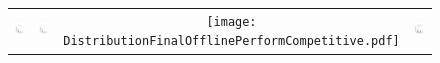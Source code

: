 \documentclass[10pt,journal,compsoc]{IEEEtran}
\begin{document}
\begin{figure}[htb]
\centering
\begin{tabular}{c c c c}
\includegraphics[width=0.47\columnwidth]{DistributionFinalOfflinePerformControl.pdf}&
\includegraphics[width=0.47\columnwidth]{DistributionFinalOfflinePerformFE.pdf}&
\texttt{[image: DistributionFinalOfflinePerformCompetitive.pdf]}&
\includegraphics[width=0.47\columnwidth]{DistributionFinalOfflinePerformCompetitiveFE.pdf}

\end{tabular}
\end{figure}
\end{document}
